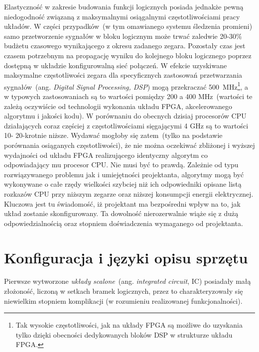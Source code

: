 Elastyczność w zakresie budowania funkcji logicznych posiada jednakże pewną niedogodność związaną z maksymalnymi osiągalnymi częstotliwościami pracy układów. W części przypadków~(w tym omawianego systemu śledzenia promieni) samo przetworzenie sygnałów w bloku logicznym może trwać zaledwie 20-30\% budżetu czasowego wynikającego z okresu zadanego zegara. Pozostały czas jest czasem potrzebnym na propagację wyniku do kolejnego bloku logicznego poprzez dostępną w układzie konfigurowalną sieć połączeń. W efekcie uzyskiwane maksymalne częstotliwości zegara dla specyficznych zastosowań przetwarzania sygnałów~(ang. \textit{Digital Signal Processing, DSP}) mogą przekraczać 500~MHz\footnote{Tak wysokie częstotliwości, jak na układy FPGA są możliwe do uzyskania tylko dzięki obecności dedykowanych bloków DSP w strukturze układu FPGA.}, a w typowych zastosowaniach są to wartości pomiędzy 200 a 400 MHz~(wartości te zależą oczywiście od technologii wykonania układu FPGA, akcelerowanego algorytmu i jakości kodu). W porównaniu do obecnych dzisiaj procesorów CPU działających coraz częściej z częstotliwościami sięgającymi 4 GHz są to wartości 10- 20-krotnie niższe. Wydawać mogłoby się zatem~(tylko na podstawie porównania osiąganych częstotliwości), że nie można oczekiwać zbliżonej i wyższej wydajności od układu FPGA realizującego identyczny algorytm co odpowiadający mu procesor CPU. Nie musi być to prawdą. Zależnie od typu rozwiązywanego problemu jak i umiejętności projektanta, algorytmy mogą być wykonywane o całe rzędy wielkości szybciej niż ich odpowiedniki opisane listą rozkazów CPU przy niższym zegarze oraz niższej konsumpcji energii elektrycznej. Kluczowa jest tu świadomość, iż projektant ma bezpośredni wpływ na to, jak układ zostanie skonfigurowany. Ta dowolność nierozerwalnie wiąże się z dużą odpowiedzialnością oraz stopniem doświadczenia wymaganego od projektanta.

\section{Konfiguracja i języki opisu sprzętu}
Pierwsze wytworzone \textit{układy scalone}~(ang. \textit{integrated circuit}, IC) posiadały małą złożoność, liczoną w setkach bramek logicznych, przez to charakteryzowały się niewielkim stopniem komplikacji (w rozumieniu realizowanej funkcjonalności). 

